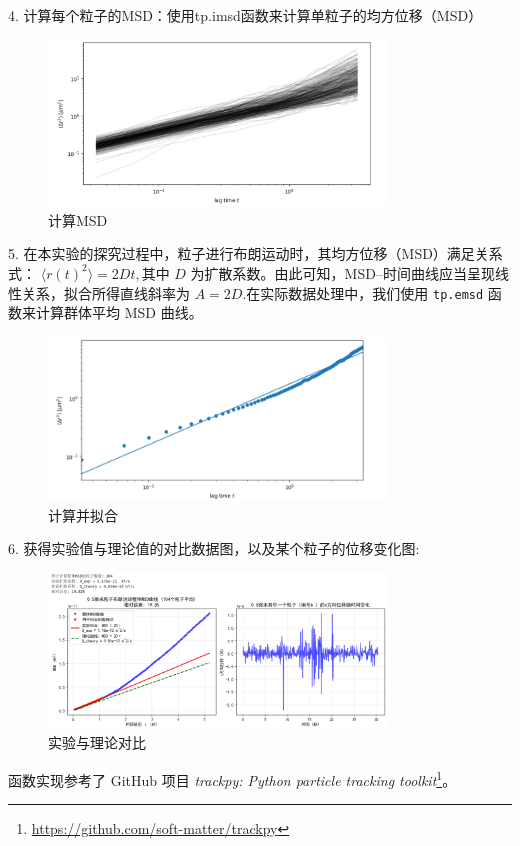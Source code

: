 \documentclass[a4paper]{report} %
\begin{document}
4. 计算每个粒子的MSD：使用tp.imsd函数来计算单粒子的均方位移（MSD）
\begin{figure}[H]
    \centering
    \includegraphics[width=0.8\textwidth]{计算MSD.png}
    \caption{计算MSD}
\end{figure} 
5. 在本实验的探究过程中，粒子进行布朗运动时，其均方位移（MSD）满足关系式：
$\langle r(t)^2 \rangle = 2Dt,$其中 $D$ 为扩散系数。由此可知，MSD--时间曲线应当呈现线性关系，拟合所得直线斜率为
$A = 2D.$在实际数据处理中，我们使用 \texttt{tp.emsd} 函数来计算群体平均 MSD 曲线。
\begin{figure}[H]
    \centering
    \includegraphics[width=0.8\textwidth]{计算并拟合.png}
    \caption{计算并拟合}
\end{figure} 
6. 获得实验值与理论值的对比数据图，以及某个粒子的位移变化图:
\begin{figure}[H]
    \centering
    \includegraphics[width=0.8\textwidth]{实际示例.png}
    \caption{实验与理论对比}
\end{figure} 
函数实现参考了 GitHub 项目 \emph{trackpy: Python particle tracking toolkit}\footnote{\url{https://github.com/soft-matter/trackpy}}。
\end{document}
